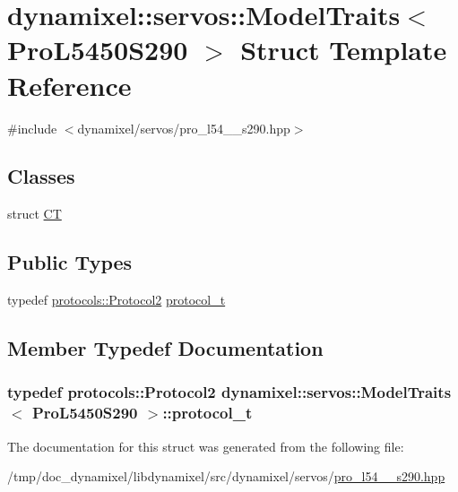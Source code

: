 \hypertarget{structdynamixel_1_1servos_1_1_model_traits_3_01_pro_l5450_s290_01_4}{}\section{dynamixel\+:\+:servos\+:\+:Model\+Traits$<$ Pro\+L5450\+S290 $>$ Struct Template Reference}
\label{structdynamixel_1_1servos_1_1_model_traits_3_01_pro_l5450_s290_01_4}


{\ttfamily \#include $<$dynamixel/servos/pro\+\_\+l54\+\_\+\_\+s290.\+hpp$>$}

\subsection*{Classes}
\begin{DoxyCompactItemize}
\item 
struct \hyperlink{structdynamixel_1_1servos_1_1_model_traits_3_01_pro_l5450_s290_01_4_1_1_c_t}{CT}
\end{DoxyCompactItemize}
\subsection*{Public Types}
\begin{DoxyCompactItemize}
\item 
typedef \hyperlink{classdynamixel_1_1protocols_1_1_protocol2}{protocols\+::\+Protocol2} \hyperlink{structdynamixel_1_1servos_1_1_model_traits_3_01_pro_l5450_s290_01_4_a1c4916b8670ad8da2e5502d488c4bc5f}{protocol\+\_\+t}
\end{DoxyCompactItemize}


\subsection{Member Typedef Documentation}
\subsubsection[{\texorpdfstring{protocol\+\_\+t}{protocol_t}}]{\setlength{\rightskip}{0pt plus 5cm}typedef {\bf protocols\+::\+Protocol2} {\bf dynamixel\+::servos\+::\+Model\+Traits}$<$ {\bf Pro\+L5450\+S290} $>$\+::{\bf protocol\+\_\+t}}\hypertarget{structdynamixel_1_1servos_1_1_model_traits_3_01_pro_l5450_s290_01_4_a1c4916b8670ad8da2e5502d488c4bc5f}{}\label{structdynamixel_1_1servos_1_1_model_traits_3_01_pro_l5450_s290_01_4_a1c4916b8670ad8da2e5502d488c4bc5f}


The documentation for this struct was generated from the following file\+:\begin{DoxyCompactItemize}
\item 
/tmp/doc\+\_\+dynamixel/libdynamixel/src/dynamixel/servos/\hyperlink{pro__l54__50__s290_8hpp}{pro\+\_\+l54\+\_\+\_\+s290.\+hpp}\end{DoxyCompactItemize}
